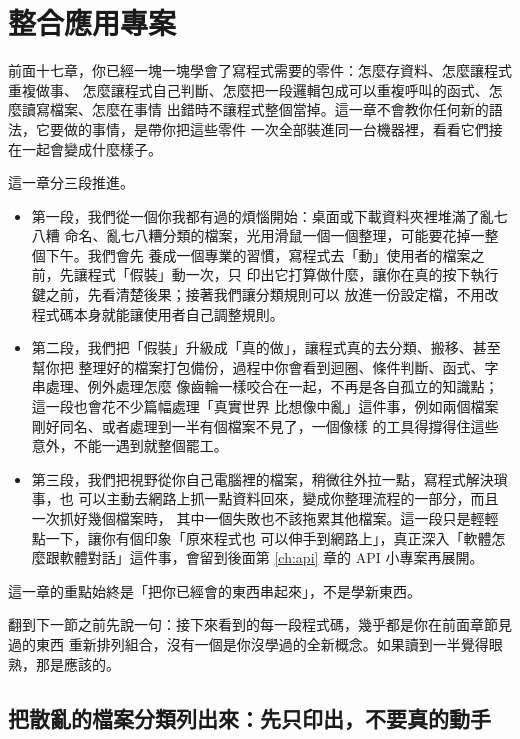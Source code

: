 \chapter{整合應用專案}
\label{ch:automating}

前面十七章，你已經一塊一塊學會了寫程式需要的零件：怎麼存資料、怎麼讓程式重複做事、
怎麼讓程式自己判斷、怎麼把一段邏輯包成可以重複呼叫的函式、怎麼讀寫檔案、怎麼在事情
出錯時不讓程式整個當掉。這一章不會教你任何新的語法，它要做的事情，是帶你把這些零件
一次全部裝進同一台機器裡，看看它們接在一起會變成什麼樣子。

這一章分三段推進。

\begin{itemize}
\item 第一段，我們從一個你我都有過的煩惱開始：桌面或下載資料夾裡堆滿了亂七八糟
命名、亂七八糟分類的檔案，光用滑鼠一個一個整理，可能要花掉一整個下午。我們會先
養成一個專業的習慣，寫程式去「動」使用者的檔案之前，先讓程式「假裝」動一次，只
印出它打算做什麼，讓你在真的按下執行鍵之前，先看清楚後果；接著我們讓分類規則可以
放進一份設定檔，不用改程式碼本身就能讓使用者自己調整規則。
\item 第二段，我們把「假裝」升級成「真的做」，讓程式真的去分類、搬移、甚至幫你把
整理好的檔案打包備份，過程中你會看到迴圈、條件判斷、函式、字串處理、例外處理怎麼
像齒輪一樣咬合在一起，不再是各自孤立的知識點；這一段也會花不少篇幅處理「真實世界
比想像中亂」這件事，例如兩個檔案剛好同名、或者處理到一半有個檔案不見了，一個像樣
的工具得撐得住這些意外，不能一遇到就整個罷工。
\item 第三段，我們把視野從你自己電腦裡的檔案，稍微往外拉一點，寫程式解決瑣事，也
可以主動去網路上抓一點資料回來，變成你整理流程的一部分，而且一次抓好幾個檔案時，
其中一個失敗也不該拖累其他檔案。這一段只是輕輕點一下，讓你有個印象「原來程式也
可以伸手到網路上」，真正深入「軟體怎麼跟軟體對話」這件事，會留到後面第 \ref{ch:api} 章的
API 小專案再展開。
\end{itemize}

這一章的重點始終是「把你已經會的東西串起來」，不是學新東西。

翻到下一節之前先說一句：接下來看到的每一段程式碼，幾乎都是你在前面章節見過的東西
重新排列組合，沒有一個是你沒學過的全新概念。如果讀到一半覺得眼熟，那是應該的。

\section{把散亂的檔案分類列出來：先只印出，不要真的動手}
\label{sec:list-preview}

